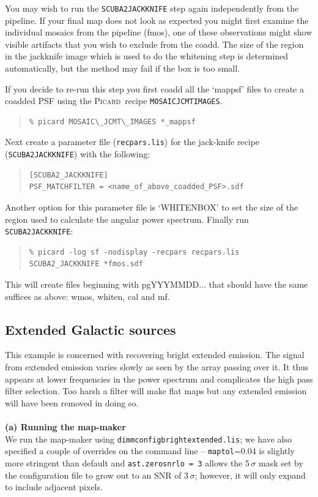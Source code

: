 \documentclass[twoside,11pt]{article}
\newcommand{\xref}[3]{#1}
\newcommand{\xlabel}[1]{}
\renewcommand{\_}{\texttt{\symbol{95}}}
\newenvironment{myquote}{\begin{quote}\begin{small}}{\end{small}\end{quote}}
\newcommand{\picard}{\xref{\textsc{Picard}}{sun265}{}}
\newcommand{\drrecipe}[1]{\texttt{#1}}
\begin{document}
You may wish to run the \drrecipe{SCUBA2\_JACKKNIFE} step again
independently from the pipeline. If your final map does not look as
expected you might first examine the individual mosaics from the
pipeline (\_fmos), one of these observations might show visible
artifacts that you wish to exclude from the coadd. The size of the
region in the jackknife image which is used to do the whitening step
is determined automatically, but the method may fail if the box is too
small.

If you decide to re-run this step you first coadd all the `\_mappsf'
files to create a coadded PSF using the \picard\ recipe
\xref{\drrecipe{MOSAIC\_JCMT\_IMAGES}}{sun265}{MOSAIC_JCMT_IMAGES}.
\begin{myquote}
\begin{verbatim}
% picard MOSAIC\_JCMT\_IMAGES *_mappsf
\end{verbatim}
\end{myquote}
Next create a parameter file (\texttt{recpars.lis}) for the jack-knife
recipe (\drrecipe{SCUBA2\_JACKKNIFE}) with the following:
\begin{myquote}
\begin{verbatim}
[SCUBA2_JACKKNIFE]
PSF_MATCHFILTER = <name_of_above_coadded_PSF>.sdf
\end{verbatim}
\end{myquote}
Another option for this parameter file is `WHITEN\_BOX' to set the
size of the region used to calculate the angular power spectrum.
Finally run \drrecipe{SCUBA2\_JACKKNIFE}:
\begin{myquote}
\begin{verbatim}
% picard -log sf -nodisplay -recpars recpars.lis SCUBA2_JACKKNIFE *fmos.sdf
\end{verbatim}
\end{myquote}
This will create files beginning with pgYYYMMDD$\ldots$ that should have
the same suffices as above: \_wmos, \_whiten, \_cal and \_mf.


\subsection{\xlabel{Galactic}Extended Galactic sources}
\label{sec:bright_ex}

This example is concerned with recovering bright extended emission.
The signal from extended emission varies slowly as seen by the array
passing over it. It thus appears at lower frequencies in the power
spectrum and complicates the high pass filter selection. Too harsh a
filter will make flat maps but any extended emission will have been
removed in doing so.
\\ \\
\textbf{(a) Running the map-maker}\\
We run the map-maker using \texttt{dimmconfig\_bright\_extended.lis};
we have also specified a couple of overrides on the command line --
\texttt{maptol}=0.04 is slightly more stringent than default and
\texttt{ast.zero\_snrlo = 3} allows the 5\,$\sigma$ mask set by the
configuration file to grow out to an SNR of 3\,$\sigma$; however, it
will only expand to include adjacent pixels.
\end{document}
